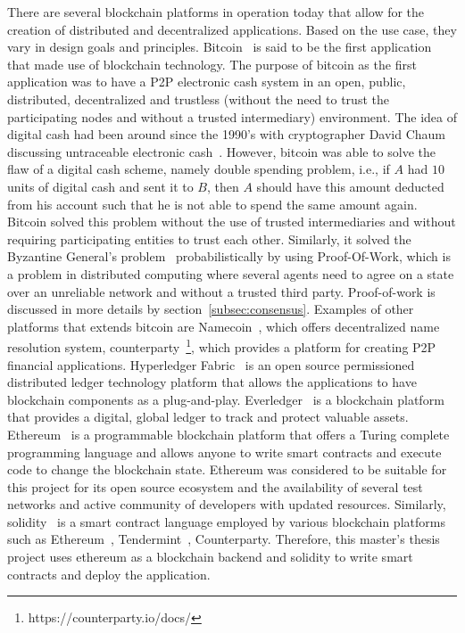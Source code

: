 There are several blockchain platforms in operation today that allow for the
creation of distributed and decentralized applications. Based on the use case,
they vary in design goals and principles. Bitcoin~\cite{Bitcoin_Satoshi} is
said to be the first application that made use of blockchain technology. The
purpose of bitcoin as the first application was to have a P2P electronic cash
system in an open, public, distributed, decentralized and trustless (without
the need to trust the participating nodes and without a trusted intermediary)
environment. The idea of digital cash had been around since the 1990's with
cryptographer David Chaum discussing untraceable electronic
cash~\cite{chaum1988untraceable}. However, bitcoin was able to solve the flaw
of a digital cash scheme, namely double spending problem, i.e., if $A$ had $10$
units of digital cash and sent it to $B$, then $A$ should have this amount
deducted from his account such that he is not able to spend the same amount
again. Bitcoin solved this problem without the use of trusted intermediaries
and without requiring participating entities to trust each other. Similarly, it
solved the Byzantine General's
problem~\cite{lamport1982byzantine,miller2014anonymous} probabilistically by
using Proof-Of-Work, which is a problem in distributed computing where several
agents need to agree on a state over an unreliable network and without a
trusted third party. Proof-of-work is discussed in more details by
section~\ref{subsec:consensus}. Examples of other platforms that extends
bitcoin are Namecoin~\cite{kalodner2015empirical}, which offers decentralized
name resolution system, counterparty~\footnote{https://counterparty.io/docs/},
which provides a platform for creating P2P financial applications. Hyperledger
Fabric~\cite{cachin2016architecture} is an open source permissioned distributed
ledger technology platform that allows the applications to have blockchain
components as a plug-and-play.  Everledger~\cite{lomas2015everledger} is a
blockchain platform that provides a digital, global ledger to track and protect
valuable assets. Ethereum~\cite{wood2014ethereum} is a programmable blockchain
platform that offers a Turing complete programming language and allows anyone
to write smart contracts and execute code to change the blockchain state.
Ethereum was considered to be suitable for this project for its open source
ecosystem and the availability of several test networks and active community of
developers with updated resources. Similarly, solidity~\cite{SolidityDocs} is a
smart contract language employed by various blockchain platforms such as
Ethereum~\cite{wood2014ethereum}, Tendermint~\cite{TendermintDocs},
Counterparty. Therefore, this master's thesis project uses ethereum as a
blockchain backend and solidity to write smart contracts and deploy the
application.  



